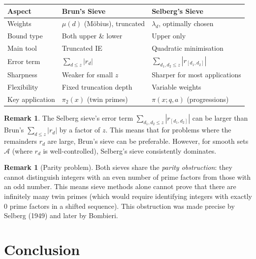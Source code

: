 \documentclass[12pt,a4paper]{amsart}
\theoremstyle{definition}
\newtheorem{remark}[theorem]{Remark}
\begin{document}
\begin{center}
\renewcommand{\arraystretch}{1.3}
\begin{tabular}{lll}
\toprule
\textbf{Aspect} & \textbf{Brun's Sieve} & \textbf{Selberg's Sieve} \\
\midrule
Weights & $\mu(d)$ (M\"obius), truncated & $\lambda_d$, optimally chosen \\
Bound type & Both upper \& lower & Upper only \\
Main tool & Truncated IE & Quadratic minimisation \\
Error term & $\sum_{d \leq z} |r_d|$ & $\sum_{d_1,d_2 \leq z} |r_{[d_1,d_2]}|$ \\
Sharpness & Weaker for small $z$ & Sharper for most applications \\
Flexibility & Fixed truncation depth & Variable weights \\
Key application & $\pi_2(x)$ (twin primes) & $\pi(x;q,a)$ (progressions) \\
\bottomrule
\end{tabular}
\end{center}

\begin{remark}
  The Selberg sieve's error term $\sum_{d_1,d_2 \leq z} |r_{[d_1,d_2]}|$
  can be larger than Brun's $\sum_{d \leq z} |r_d|$ by a factor of $z$.
  This means that for problems where the remainders $r_d$ are large, Brun's
  sieve can be preferable.  However, for smooth sets $\mathcal{A}$ (where
  $r_d$ is well-controlled), Selberg's sieve consistently dominates.
\end{remark}

\begin{remark}[Parity problem]
  Both sieves share the \emph{parity obstruction}: they cannot distinguish
  integers with an even number of prime factors from those with an odd number.
  This means sieve methods alone cannot prove that there are infinitely many
  twin primes (which would require identifying integers with exactly $0$ prime
  factors in a shifted sequence).  This obstruction was made precise by
  Selberg (1949) and later by Bombieri.
\end{remark}

\section{Conclusion}
\end{document}
